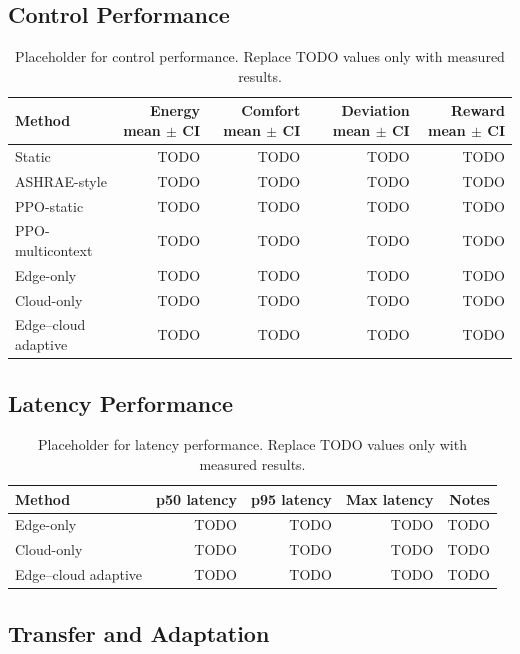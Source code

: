 \documentclass[11pt,a4paper]{article}
\begin{document}
\subsection{Control Performance}

\begin{table}[ht]
\centering
\caption{Placeholder for control performance. Replace TODO values only with measured results.}
\label{tab:control-results}
\begin{tabular}{lrrrr}
\toprule
Method & Energy mean $\pm$ CI & Comfort mean $\pm$ CI & Deviation mean $\pm$ CI & Reward mean $\pm$ CI \\
\midrule
Static & TODO & TODO & TODO & TODO \\
ASHRAE-style & TODO & TODO & TODO & TODO \\
PPO-static & TODO & TODO & TODO & TODO \\
PPO-multicontext & TODO & TODO & TODO & TODO \\
Edge-only & TODO & TODO & TODO & TODO \\
Cloud-only & TODO & TODO & TODO & TODO \\
Edge--cloud adaptive & TODO & TODO & TODO & TODO \\
\bottomrule
\end{tabular}
\end{table}

\subsection{Latency Performance}

\begin{table}[ht]
\centering
\caption{Placeholder for latency performance. Replace TODO values only with measured results.}
\label{tab:latency-results}
\begin{tabular}{lrrrr}
\toprule
Method & p50 latency & p95 latency & Max latency & Notes \\
\midrule
Edge-only & TODO & TODO & TODO & TODO \\
Cloud-only & TODO & TODO & TODO & TODO \\
Edge--cloud adaptive & TODO & TODO & TODO & TODO \\
\bottomrule
\end{tabular}
\end{table}

\subsection{Transfer and Adaptation}
\end{document}
